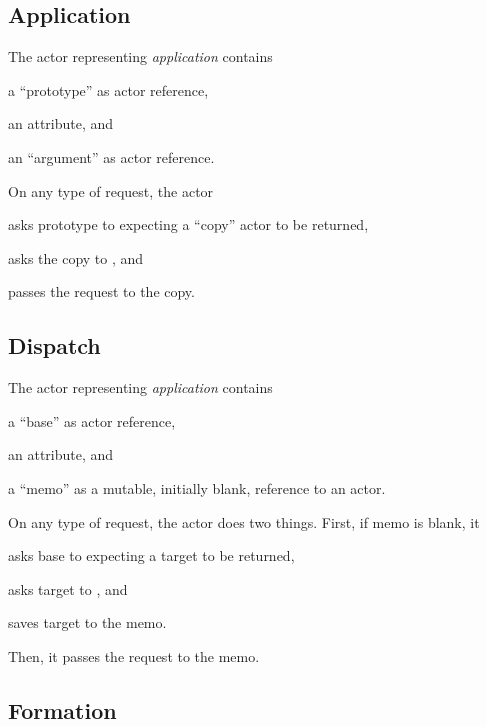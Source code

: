 \subsection{Application}

The actor representing \emph{application} contains
\begin{inparaenum}[1)]
\item a ``prototype'' as actor reference,
\item an attribute,
and
\item an ``argument'' as actor reference.
\end{inparaenum}

On any type of request, the actor
\begin{inparaenum}[1)]
\item asks prototype to  expecting a ``copy'' actor to be returned,
\item asks the copy to ,
and
\item passes the request to the copy.
\end{inparaenum}

\subsection{Dispatch}

The actor representing \emph{application} contains
\begin{inparaenum}[1)]
\item a ``base'' as actor reference,
\item an attribute,
and
\item a ``memo'' as a mutable, initially blank, reference to an actor.
\end{inparaenum}

On any type of request, the actor does two things.
First, if memo is blank, it
\begin{inparaenum}[1)]
\item asks base to  expecting a target to be returned,
\item asks target to ,
and
\item saves target to the memo.
\end{inparaenum}
Then, it passes the request to the memo.

\subsection{Formation}

